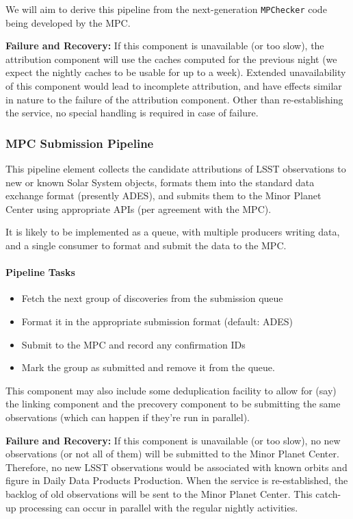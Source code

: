 We will aim to derive this pipeline from the next-generation {\tt MPChecker} code being developed by the MPC.

{\bf Failure and Recovery:} If this component is unavailable (or too slow), the attribution component will use the caches computed for the previous night (we expect the nightly caches to be usable for up to a week). Extended unavailability of this component would lead to incomplete attribution, and have effects similar in nature to the failure of the attribution component. Other than re-establishing the service, no special handling is required in case of failure.

\subsubsection{MPC Submission Pipeline}

This pipeline element collects the candidate attributions of LSST observations to new or known Solar System objects, formats them into the standard data exchange format (presently ADES), and submits them to the Minor Planet Center using appropriate APIs (per agreement with the MPC).

It is likely to be implemented as a queue, with multiple producers writing data, and a single consumer to format and submit the data to the MPC.

\paragraph{Pipeline Tasks}

\begin{itemize}
	\item Fetch the next group of discoveries from the submission queue
	\item Format it in the appropriate submission format (default: ADES)
	\item Submit to the MPC and record any confirmation IDs
	\item Mark the group as submitted and remove it from the queue.
\end{itemize}

This component may also include some deduplication facility to allow for (say) the linking component and the precovery component to be submitting the same observations (which can happen if they're run in parallel).

{\bf Failure and Recovery:} If this component is unavailable (or too slow), no new observations (or not all of them) will be submitted to the Minor Planet Center. Therefore, no new LSST observations would be associated with known orbits and figure in Daily Data Products Production. When the service is re-established, the backlog of old observations will be sent to the Minor Planet Center. This catch-up processing can occur in parallel with the regular nightly activities.

